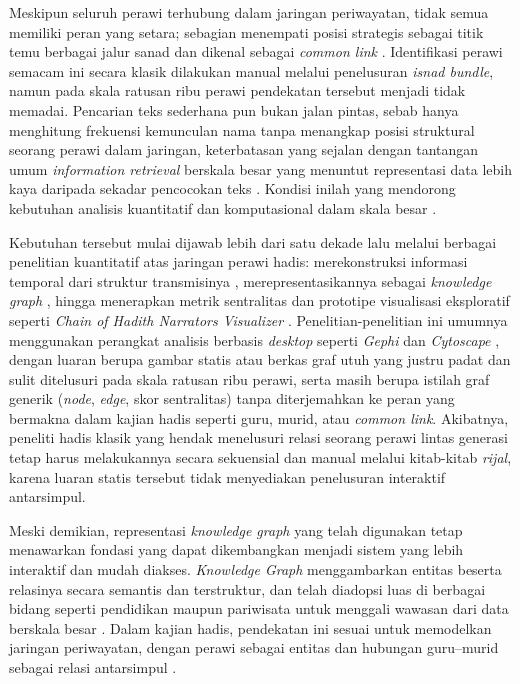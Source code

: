 Meskipun seluruh perawi terhubung dalam jaringan periwayatan, tidak semua memiliki peran yang setara; sebagian menempati posisi strategis sebagai titik temu berbagai jalur sanad dan dikenal sebagai \textit{common link} \cite{mufid2023track}. Identifikasi perawi semacam ini secara klasik dilakukan manual melalui penelusuran \textit{isnad bundle}, namun pada skala ratusan ribu perawi pendekatan tersebut menjadi tidak memadai. Pencarian teks sederhana pun bukan jalan pintas, sebab hanya menghitung frekuensi kemunculan nama tanpa menangkap posisi struktural seorang perawi dalam jaringan, keterbatasan yang sejalan dengan tantangan umum \textit{information retrieval} berskala besar yang menuntut representasi data lebih kaya daripada sekadar pencocokan teks \cite{rixewa2024interleaved}. Kondisi inilah yang mendorong kebutuhan analisis kuantitatif dan komputasional dalam skala besar \cite{FAROOQI2024110439}.

Kebutuhan tersebut mulai dijawab lebih dari satu dekade lalu melalui berbagai penelitian kuantitatif atas jaringan perawi hadis: merekonstruksi informasi temporal dari struktur transmisinya \cite{Shuaib2022}, merepresentasikannya sebagai \textit{knowledge graph} \cite{FAROOQI2024110439}, hingga menerapkan metrik sentralitas dan prototipe visualisasi eksploratif seperti \textit{Chain of Hadith Narrators Visualizer} \cite{Mghari2024Narrator2Vec}. Penelitian-penelitian ini umumnya menggunakan perangkat analisis berbasis \textit{desktop} seperti \textit{Gephi} dan \textit{Cytoscape} \cite{FAROOQI2024110439}, dengan luaran berupa gambar statis atau berkas graf utuh yang justru padat dan sulit ditelusuri pada skala ratusan ribu perawi, serta masih berupa istilah graf generik (\textit{node}, \textit{edge}, skor sentralitas) tanpa diterjemahkan ke peran yang bermakna dalam kajian hadis seperti guru, murid, atau \textit{common link}. Akibatnya, peneliti hadis klasik yang hendak menelusuri relasi seorang perawi lintas generasi tetap harus melakukannya secara sekuensial dan manual melalui kitab-kitab \textit{rijal}, karena luaran statis tersebut tidak menyediakan penelusuran interaktif antarsimpul.

\begin{sloppypar}
Meski demikian, representasi \textit{knowledge graph} yang telah digunakan tetap menawarkan fondasi yang dapat dikembangkan menjadi sistem yang lebih interaktif dan mudah diakses. \textit{Knowledge Graph} menggambarkan entitas beserta relasinya secara semantis dan terstruktur, dan telah diadopsi luas di berbagai bidang seperti pendidikan maupun pariwisata untuk menggali wawasan dari data berskala besar \cite{Aoula2026}. Dalam kajian hadis, pendekatan ini sesuai untuk memodelkan jaringan periwayatan, dengan perawi sebagai entitas dan hubungan guru--murid sebagai relasi antarsimpul \cite{FAROOQI2024110439}.
\end{sloppypar}

